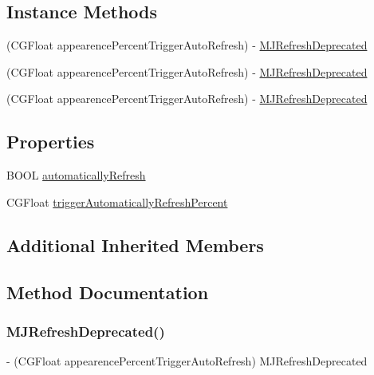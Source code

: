 \subsection*{Instance Methods}
\begin{DoxyCompactItemize}
\item 
(C\+G\+Float appearence\+Percent\+Trigger\+Auto\+Refresh) -\/ \mbox{\hyperlink{interface_m_j_refresh_auto_footer_a5d1960521eddc9122b516e7c1f479214}{M\+J\+Refresh\+Deprecated}}
\item 
(C\+G\+Float appearence\+Percent\+Trigger\+Auto\+Refresh) -\/ \mbox{\hyperlink{interface_m_j_refresh_auto_footer_a5d1960521eddc9122b516e7c1f479214}{M\+J\+Refresh\+Deprecated}}
\item 
(C\+G\+Float appearence\+Percent\+Trigger\+Auto\+Refresh) -\/ \mbox{\hyperlink{interface_m_j_refresh_auto_footer_a5d1960521eddc9122b516e7c1f479214}{M\+J\+Refresh\+Deprecated}}
\end{DoxyCompactItemize}
\subsection*{Properties}
\begin{DoxyCompactItemize}
\item 
B\+O\+OL \mbox{\hyperlink{interface_m_j_refresh_auto_footer_add687c36920e71ddc5a608556933dcfd}{automatically\+Refresh}}
\item 
C\+G\+Float \mbox{\hyperlink{interface_m_j_refresh_auto_footer_acb5016ce672ae89612fc64d1882ef26b}{trigger\+Automatically\+Refresh\+Percent}}
\end{DoxyCompactItemize}
\subsection*{Additional Inherited Members}


\subsection{Method Documentation}
\mbox{\label{interface_m_j_refresh_auto_footer_a5d1960521eddc9122b516e7c1f479214}} 
\subsubsection{\texorpdfstring{M\+J\+Refresh\+Deprecated()}{MJRefreshDeprecated()}\hspace{0.1cm}{\footnotesize\ttfamily [1/3]}}
{\footnotesize\ttfamily -\/ (C\+G\+Float appearence\+Percent\+Trigger\+Auto\+Refresh) M\+J\+Refresh\+Deprecated \begin{DoxyParamCaption}\item[{(\char`\"{}请使用automatically\+Change\+Alpha属性\char`\"{})}]{ }\end{DoxyParamCaption}}


